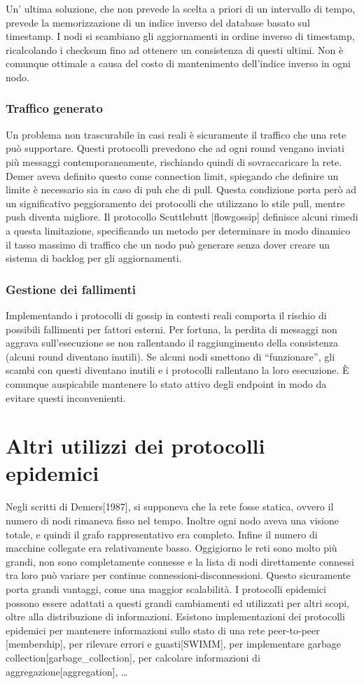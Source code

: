 Un' ultima soluzione, che non prevede la scelta a priori di un intervallo di tempo, prevede la memorizzazione di un indice inverso del database basato sul timestamp. I nodi si scambiano gli aggiornamenti in ordine inverso di timestamp, ricalcolando i checksum fino ad ottenere un consistenza di questi ultimi. Non è comunque ottimale a causa del costo di mantenimento dell’indice inverso in ogni nodo.

\subsubsection{Traffico generato}
Un problema non trascurabile in casi reali è sicuramente il traffico che una rete può supportare. Questi protocolli prevedono che ad ogni round vengano inviati più messaggi contemporaneamente, rischiando quindi di sovraccaricare la rete. Demer aveva definito questo come connection limit, spiegando che definire un limite è necessario sia in caso di puh che di pull. Questa condizione porta però ad un significativo peggioramento dei protocolli che utilizzano lo stile pull, mentre push diventa migliore. Il protocollo Scuttlebutt [flowgossip] definisce alcuni rimedi a questa limitazione, specificando un metodo per determinare in modo dinamico il tasso massimo di traffico che un nodo può generare senza dover creare un sistema di backlog per gli aggiornamenti. 

\subsubsection{Gestione dei fallimenti}
Implementando i protocolli di gossip in contesti reali comporta il rischio di possibili fallimenti per fattori esterni. Per fortuna, la perdita di messaggi non aggrava sull’esecuzione se non rallentando il raggiungimento della consistenza (alcuni round diventano inutili). Se alcuni nodi smettono di “funzionare”, gli scambi con questi diventano inutili e i protocolli rallentano la loro esecuzione. È comunque auspicabile mantenere lo stato attivo degli endpoint in modo da evitare questi inconvenienti.

\section{Altri utilizzi dei protocolli epidemici}

Negli scritti di Demers[1987], si supponeva che la rete fosse statica, ovvero il numero di nodi rimaneva fisso nel tempo. Inoltre ogni nodo aveva una visione totale, e quindi il grafo rappresentativo era completo. Infine il numero di macchine collegate era relativamente basso.
Oggigiorno le reti sono molto più grandi, non sono completamente connesse e la lista di nodi direttamente connessi tra loro può variare per continue connessioni-disconnessioni. Questo sicuramente porta grandi vantaggi, come una maggior scalabilità. I protocolli epidemici possono essere adattati a questi grandi cambiamenti ed utilizzati per altri scopi, oltre alla distribuzione di informazioni. Esistono implementazioni dei protocolli epidemici per mantenere informazioni sullo stato di una rete peer-to-peer [membership], per rilevare errori e guasti[SWIMM], per implementare garbage collection[garbage\_collection], per calcolare informazioni di aggregazione[aggregation], …
